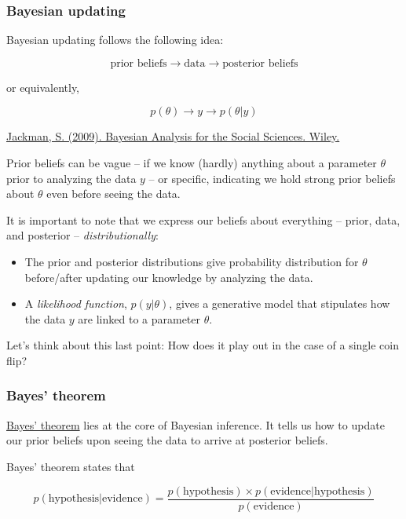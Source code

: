 \documentclass[
  11pt,
]{article}
\providecommand{\tightlist}{%
  \setlength{\itemsep}{0pt}\setlength{\parskip}{0pt}}
\begin{document}
\hypertarget{bayesian-updating}{%
\subsubsection{Bayesian updating}\label{bayesian-updating}}

Bayesian updating follows the following idea:

\[
\text{prior beliefs} \rightarrow \text{data} \rightarrow \text{posterior beliefs}
\]

or equivalently,

\[
p(\theta) \rightarrow y \rightarrow p(\theta| y)
\]

\href{https://onlinelibrary.wiley.com/doi/book/10.1002/9780470686621}{Jackman, S. (2009). Bayesian Analysis for the Social
Sciences.
Wiley.}

Prior beliefs can be vague -- if we know (hardly) anything about a
parameter \(\theta\) prior to analyzing the data \(y\) -- or specific,
indicating we hold strong prior beliefs about \(\theta\) even before
seeing the data.

It is important to note that we express our beliefs about everything --
prior, data, and posterior -- \emph{distributionally}:

\begin{itemize}
\tightlist
\item
  The prior and posterior distributions give probability distribution
  for \(\theta\) before/after updating our knowledge by analyzing the
  data.
\item
  A \emph{likelihood function}, \(p(y|\theta)\), gives a generative model
  that stipulates how the data \(y\) are linked to a parameter \(\theta\).
\end{itemize}

Let's think about this last point: How does it play out in the case of a
single coin flip?

\hypertarget{bayes-theorem}{%
\subsubsection{Bayes' theorem}\label{bayes-theorem}}

\href{https://en.wikipedia.org/wiki/Bayes\%27_theorem}{Bayes' theorem} lies at
the core of Bayesian inference. It tells us how to update our prior
beliefs upon seeing the data to arrive at posterior beliefs.

Bayes' theorem states that

\[
p(\text{hypothesis|evidence}) = \frac{p(\text{hypothesis}) \times p(\text{evidence|hypothesis}) }{p(\text{evidence})}
\]
\end{document}
